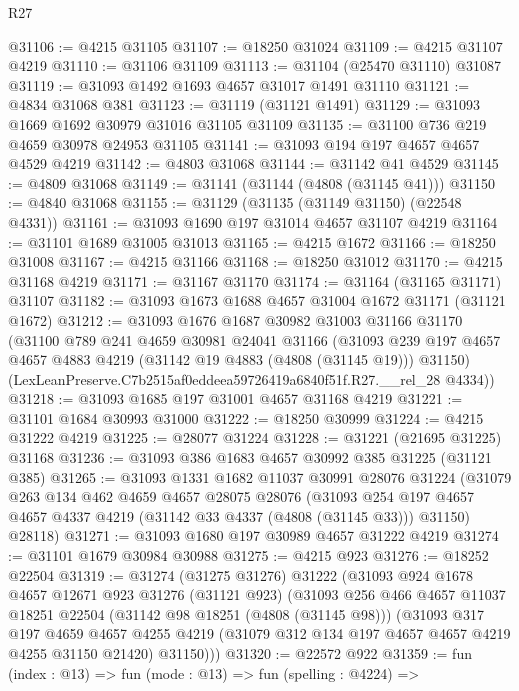 \begin{lexlean}{R27}
\begin{coremodule}
@31106 := @4215 @31105
@31107 := @18250 @31024
@31109 := @4215 @31107 @4219
@31110 := @31106 @31109
@31113 := @31104 (@25470 @31110) @31087
@31119 := @31093 @1492 @1693 @4657 @31017 @1491 @31110
@31121 := @4834 @31068 @381
@31123 := @31119 (@31121 @1491)
@31129 := @31093 @1669 @1692 @30979 @31016 @31105 @31109
@31135 := @31100 @736 @219 @4659 @30978 @24953 @31105
@31141 := @31093 @194 @197 @4657 @4657 @4529 @4219
@31142 := @4803 @31068
@31144 := @31142 @41 @4529
@31145 := @4809 @31068
@31149 := @31141 (@31144 (@4808 (@31145 @41)))
@31150 := @4840 @31068
@31155 := @31129 (@31135 (@31149 @31150) (@22548 @4331))
@31161 := @31093 @1690 @197 @31014 @4657 @31107 @4219
@31164 := @31101 @1689 @31005 @31013
@31165 := @4215 @1672
@31166 := @18250 @31008
@31167 := @4215 @31166
@31168 := @18250 @31012
@31170 := @4215 @31168 @4219
@31171 := @31167 @31170
@31174 := @31164 (@31165 @31171) @31107
@31182 := @31093 @1673 @1688 @4657 @31004 @1672 @31171 (@31121 @1672)
@31212 := @31093
    @1676
    @1687
    @30982
    @31003
    @31166
    @31170
    (@31100
      @789
      @241
      @4659
      @30981
      @24041
      @31166
      (@31093 @239 @197 @4657 @4657 @4883 @4219 (@31142 @19 @4883 (@4808 (@31145 @19))) @31150)
      (LexLeanPreserve.C7b2515af0eddeea59726419a6840f51f.R27.__rel_28 @4334))
@31218 := @31093 @1685 @197 @31001 @4657 @31168 @4219
@31221 := @31101 @1684 @30993 @31000
@31222 := @18250 @30999
@31224 := @4215 @31222 @4219
@31225 := @28077 @31224
@31228 := @31221 (@21695 @31225) @31168
@31236 := @31093 @386 @1683 @4657 @30992 @385 @31225 (@31121 @385)
@31265 := @31093
    @1331
    @1682
    @11037
    @30991
    @28076
    @31224
    (@31079
      @263
      @134
      @462
      @4659
      @4657
      @28075
      @28076
      (@31093 @254 @197 @4657 @4657 @4337 @4219 (@31142 @33 @4337 (@4808 (@31145 @33))) @31150)
      @28118)
@31271 := @31093 @1680 @197 @30989 @4657 @31222 @4219
@31274 := @31101 @1679 @30984 @30988
@31275 := @4215 @923
@31276 := @18252 @22504
@31319 := @31274
    (@31275 @31276)
    @31222
    (@31093
      @924
      @1678
      @4657
      @12671
      @923
      @31276
      (@31121 @923)
      (@31093
        @256
        @466
        @4657
        @11037
        @18251
        @22504
        (@31142 @98 @18251 (@4808 (@31145 @98)))
        (@31093
          @317
          @197
          @4659
          @4657
          @4255
          @4219
          (@31079 @312 @134 @197 @4657 @4657 @4219 @4255 @31150 @21420)
          @31150)))
@31320 := @22572 @922
@31359 := fun (index : @13) =>
  fun (mode : @13) =>
  fun (spelling : @4224) =>

\end{coremodule}
\end{lexlean}
